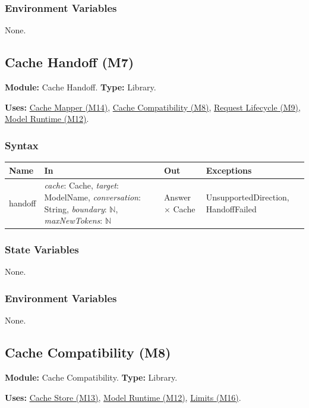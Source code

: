 \documentclass[12pt, titlepage]{article}
\begin{document}
\subsubsection*{Environment Variables}

None.

\newpage
\subsection{Cache Handoff (M7)}\label{mHandoff}

\textbf{Module:} Cache Handoff. \textbf{Type:} Library.

\textbf{Uses:} \hyperref[mMap]{Cache Mapper (M14)}, \hyperref[mCompat]{Cache Compatibility (M8)}, \hyperref[mLife]{Request Lifecycle (M9)}, \hyperref[mModelRun]{Model Runtime (M12)}.

\subsubsection*{Syntax}

\begin{tabularx}{\textwidth}{l X l X}
\toprule
\textbf{Name} & \textbf{In} & \textbf{Out} & \textbf{Exceptions}\\
\midrule
handoff & \emph{cache}: Cache, \emph{target}: ModelName, \emph{conversation}: String, \emph{boundary}: $\mathbb{N}$, \emph{maxNewTokens}: $\mathbb{N}$ & Answer $\times$ Cache & UnsupportedDirection, HandoffFailed\\
\bottomrule
\end{tabularx}

\subsubsection*{State Variables}

None.

\subsubsection*{Environment Variables}

None.

\newpage
\subsection{Cache Compatibility (M8)}\label{mCompat}

\textbf{Module:} Cache Compatibility. \textbf{Type:} Library.

\textbf{Uses:} \hyperref[mCache]{Cache Store (M13)}, \hyperref[mModelRun]{Model Runtime (M12)}, \hyperref[mLimits]{Limits (M16)}.
\end{document}
